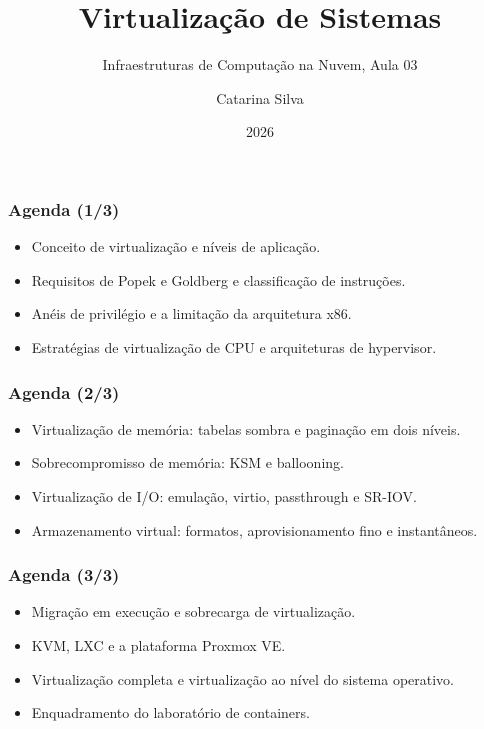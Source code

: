 \documentclass[aspectratio=169]{beamer}
\title{Virtualização de Sistemas}
\subtitle{Infraestruturas de Computação na Nuvem, Aula 03}
\author{Catarina Silva}
\institute{ESTGA, Universidade de Aveiro}
\date{2026}
\begin{document}
\begin{frame}[plain]
  \titlepage
\end{frame}

\begin{frame}
\frametitle{Agenda \textcolor{NudeTaupe}{\small(1/3)}}
\begin{itemize}
    \setlength\itemsep{0.4cm}
    \item Conceito de virtualização e níveis de aplicação.
    \item Requisitos de Popek e Goldberg e classificação de instruções.
    \item Anéis de privilégio e a limitação da arquitetura x86.
    \item Estratégias de virtualização de CPU e arquiteturas de hypervisor.
\end{itemize}
\end{frame}

\begin{frame}
\frametitle{Agenda \textcolor{NudeTaupe}{\small(2/3)}}
\begin{itemize}
    \setlength\itemsep{0.4cm}
    \item Virtualização de memória: tabelas sombra e paginação em dois níveis.
    \item Sobrecompromisso de memória: KSM e ballooning.
    \item Virtualização de I/O: emulação, virtio, passthrough e SR-IOV.
    \item Armazenamento virtual: formatos, aprovisionamento fino e instantâneos.
\end{itemize}
\end{frame}

\begin{frame}
\frametitle{Agenda \textcolor{NudeTaupe}{\small(3/3)}}
\begin{itemize}
    \setlength\itemsep{0.4cm}
    \item Migração em execução e sobrecarga de virtualização.
    \item KVM, LXC e a plataforma Proxmox VE.
    \item Virtualização completa e virtualização ao nível do sistema operativo.
    \item Enquadramento do laboratório de containers.
\end{itemize}
\end{frame}
\end{document}
